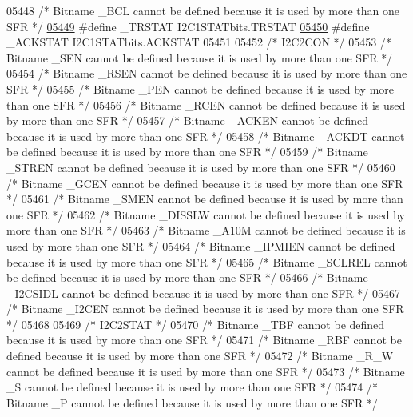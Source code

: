 \begin{DoxyCode}
05448 \textcolor{comment}{/* Bitname \_BCL cannot be defined because it is used by more than one SFR */}
\hypertarget{a00009_source_l05449}{}\hyperlink{a00009_aa3ff3c708a1cc5019e81a2ffe6e62fb6}{05449} \textcolor{preprocessor}{#define \_TRSTAT I2C1STATbits.TRSTAT}
\hypertarget{a00009_source_l05450}{}\hyperlink{a00009_a1b2ab09c4abbe6df3113a5f4fb6ee46e}{05450} \textcolor{preprocessor}{#define \_ACKSTAT I2C1STATbits.ACKSTAT}
05451 
05452 \textcolor{comment}{/* I2C2CON */}
05453 \textcolor{comment}{/* Bitname \_SEN cannot be defined because it is used by more than one SFR */}
05454 \textcolor{comment}{/* Bitname \_RSEN cannot be defined because it is used by more than one SFR */}
05455 \textcolor{comment}{/* Bitname \_PEN cannot be defined because it is used by more than one SFR */}
05456 \textcolor{comment}{/* Bitname \_RCEN cannot be defined because it is used by more than one SFR */}
05457 \textcolor{comment}{/* Bitname \_ACKEN cannot be defined because it is used by more than one SFR */}
05458 \textcolor{comment}{/* Bitname \_ACKDT cannot be defined because it is used by more than one SFR */}
05459 \textcolor{comment}{/* Bitname \_STREN cannot be defined because it is used by more than one SFR */}
05460 \textcolor{comment}{/* Bitname \_GCEN cannot be defined because it is used by more than one SFR */}
05461 \textcolor{comment}{/* Bitname \_SMEN cannot be defined because it is used by more than one SFR */}
05462 \textcolor{comment}{/* Bitname \_DISSLW cannot be defined because it is used by more than one SFR */}
05463 \textcolor{comment}{/* Bitname \_A10M cannot be defined because it is used by more than one SFR */}
05464 \textcolor{comment}{/* Bitname \_IPMIEN cannot be defined because it is used by more than one SFR */}
05465 \textcolor{comment}{/* Bitname \_SCLREL cannot be defined because it is used by more than one SFR */}
05466 \textcolor{comment}{/* Bitname \_I2CSIDL cannot be defined because it is used by more than one SFR */}
05467 \textcolor{comment}{/* Bitname \_I2CEN cannot be defined because it is used by more than one SFR */}
05468 
05469 \textcolor{comment}{/* I2C2STAT */}
05470 \textcolor{comment}{/* Bitname \_TBF cannot be defined because it is used by more than one SFR */}
05471 \textcolor{comment}{/* Bitname \_RBF cannot be defined because it is used by more than one SFR */}
05472 \textcolor{comment}{/* Bitname \_R\_W cannot be defined because it is used by more than one SFR */}
05473 \textcolor{comment}{/* Bitname \_S cannot be defined because it is used by more than one SFR */}
05474 \textcolor{comment}{/* Bitname \_P cannot be defined because it is used by more than one SFR */}

\end{DoxyCode}
